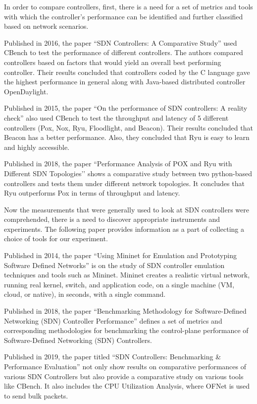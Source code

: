 In order to compare controllers, first, there is a need for a set of metrics and tools with which the controller's performance can be identified and further classified based on network scenarios.

Published in 2016, the paper ``SDN Controllers: A Comparative Study'' \cite{adaptiveroute2006}  used CBench to test the performance of different controllers. The authors compared controllers based on factors that would yield an overall best performing controller. Their results concluded that controllers coded by the C language gave the highest performance in general along with Java-based distributed controller OpenDaylight.

Published in 2015, the paper ``On the performance of SDN controllers: A reality check'' \cite{realitycheck}  also used CBench to test the throughput and latency of 5 different controllers (Pox, Nox, Ryu, Floodlight, and Beacon). Their results concluded that Beacon has a better performance. Also, they concluded that Ryu is easy to learn and highly accessible.

Published in 2018, the paper ``Performance Analysis of POX and Ryu with Different SDN Topologies’’ shows a comparative study between two python-based controllers and tests them under different network topologies. It concludes that Ryu outperforms Pox in terms of throughput and latency.

Now the measurements that were generally used to look at SDN controllers were comprehended, there is a need to discover appropriate instruments and experiments. The following paper provides information as a part of collecting a choice of tools for our experiment.

Published in 2014, the paper ``Using Mininet for Emulation and Prototyping Software Defined Networks'' \cite{mininet2014} is on the study of SDN controller emulation techniques and tools such as Mininet. Mininet creates a realistic virtual network, running real kernel, switch, and application code, on a single machine (VM, cloud, or native), in seconds, with a single command.

Published in 2018, the paper ``Benchmarking Methodology for Software-Defined Networking (SDN) Controller Performance'' \cite{rfc8456} defines a set of metrics and corresponding methodologies for benchmarking the control-plane performance of Software-Defined Networking (SDN) Controllers.

Published in 2019, the paper titled ``SDN Controllers: Benchmarking \& Performance Evaluation'' \cite{zhu2019sdn} not only show results on comparative performances of various SDN Controllers but also provide a comparative study on various tools like CBench. It also includes the CPU Utilization Analysis, where OFNet is used to send bulk packets.

